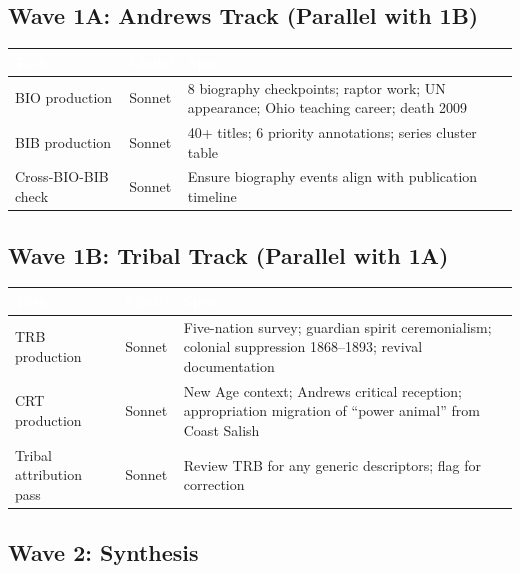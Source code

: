 \documentclass[11pt,letterpaper]{article}
\newcommand{\tableheader}[1]{\textbf{\sffamily\textcolor{white}{#1}}}
\begin{document}
\subsection{Wave 1A: Andrews Track (Parallel with 1B)}

\begin{center}
\begin{tabularx}{\textwidth}{L{2.5cm}L{2cm}X}
\toprule
{}
\tableheader{Task} & \tableheader{Model} & \tableheader{Spec} \\
\midrule
BIO production & Sonnet & 8 biography checkpoints; raptor work; UN appearance; Ohio teaching career; death 2009 \\
BIB production & Sonnet & 40+ titles; 6 priority annotations; series cluster table \\
Cross-BIO-BIB check & Sonnet & Ensure biography events align with publication timeline \\
\bottomrule
\end{tabularx}
\end{center}

\subsection{Wave 1B: Tribal Track (Parallel with 1A)}

\begin{center}
\begin{tabularx}{\textwidth}{L{2.5cm}L{2cm}X}
\toprule
{}
\tableheader{Task} & \tableheader{Model} & \tableheader{Spec} \\
\midrule
TRB production & Sonnet & Five-nation survey; guardian spirit ceremonialism; colonial suppression 1868--1893; revival documentation \\
CRT production & Sonnet & New Age context; Andrews critical reception; appropriation migration of ``power animal'' from Coast Salish \\
Tribal attribution pass & Sonnet & Review TRB for any generic descriptors; flag for correction \\
\bottomrule
\end{tabularx}
\end{center}

\subsection{Wave 2: Synthesis}
\end{document}
